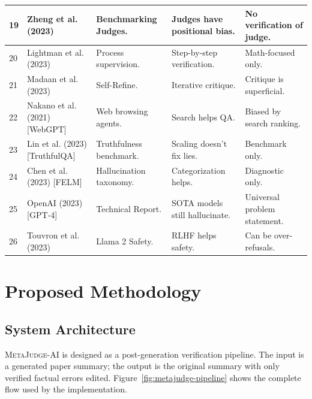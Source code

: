 \documentclass[12pt, a4paper]{report}
\newcommand{\sys}{\textsc{MetaJudge-AI}}
\begin{document}
\begin{longtable}{|p{0.8cm}|p{3.5cm}|p{4.0cm}|p{3.5cm}|p{2.5cm}|}
    19 & Zheng et al. (2023) & Benchmarking Judges. & Judges have positional bias. & No verification of judge. \\ \hline

    20 & Lightman et al. (2023) & Process supervision. & Step-by-step verification. & Math-focused only. \\ \hline

    21 & Madaan et al. (2023) & Self-Refine. & Iterative critique. & Critique is superficial. \\ \hline

    22 & Nakano et al. (2021) [WebGPT] & Web browsing agents. & Search helps QA. & Biased by search ranking. \\ \hline

    23 & Lin et al. (2023) [TruthfulQA] & Truthfulness benchmark. & Scaling doesn't fix lies. & Benchmark only. \\ \hline

    24 & Chen et al. (2023) [FELM] & Hallucination taxonomy. & Categorization helps. & Diagnostic only. \\ \hline

    25 & OpenAI (2023) [GPT-4] & Technical Report. & SOTA models still hallucinate. & Universal problem statement. \\ \hline

    26 & Touvron et al. (2023) & Llama 2 Safety. & RLHF helps safety. & Can be over-refusals. \\ \hline

    \end{longtable}

\chapter{Proposed Methodology}

\section{System Architecture}

\sys{} is designed as a post-generation verification pipeline. The input is a
generated paper summary; the output is the original summary with only verified
factual errors edited. Figure~\ref{fig:metajudge-pipeline} shows the complete
flow used by the implementation.
\end{document}
